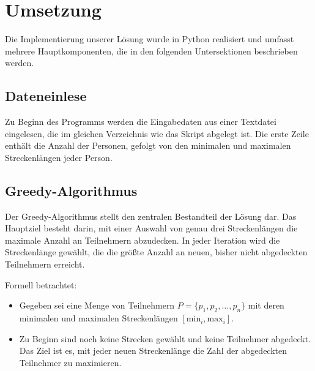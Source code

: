 \documentclass[a4paper,10pt,ngerman]{scrartcl}
\begin{document}
\section{Umsetzung}

Die Implementierung unserer Lösung wurde in Python realisiert und umfasst mehrere Hauptkomponenten, die in den folgenden Untersektionen beschrieben werden.


\subsection{Dateneinlese}

Zu Beginn des Programms werden die Eingabedaten aus einer Textdatei eingelesen, die im gleichen Verzeichnis wie das Skript abgelegt ist. Die erste Zeile enthält die Anzahl der Personen, gefolgt von den minimalen und maximalen Streckenlängen jeder Person.

\subsection{Greedy-Algorithmus}

Der Greedy-Algorithmus stellt den zentralen Bestandteil der Lösung dar. Das Hauptziel besteht darin, mit einer Auswahl von genau drei Streckenlängen die maximale Anzahl an Teilnehmern abzudecken. In jeder Iteration wird die Streckenlänge gewählt, die die größte Anzahl an neuen, bisher nicht abgedeckten Teilnehmern erreicht.

Formell betrachtet:
\begin{itemize}
    \item Gegeben sei eine Menge von Teilnehmern \( P = \{ p_1, p_2, \dots, p_n \} \) mit deren minimalen und maximalen Streckenlängen \( [\text{min}_i, \text{max}_i] \).
    \item Zu Beginn sind noch keine Strecken gewählt und keine Teilnehmer abgedeckt. Das Ziel ist es, mit jeder neuen Streckenlänge die Zahl der abgedeckten Teilnehmer zu maximieren.
\end{itemize}
\end{document}
